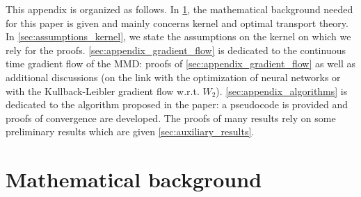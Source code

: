 

This appendix is organized as follows. In \cref{sec:appendix_math_background}, the mathematical background needed for this paper is given and mainly concerns kernel and optimal transport theory. In \cref{sec:assumptions_kernel}, we state the assumptions on the kernel on which we rely for the proofs. \cref{sec:appendix_gradient_flow} is dedicated to the continuous time gradient flow of the MMD: proofs of \cref{sec:appendix_gradient_flow} as well as additional discussions (on the link with the optimization of neural networks or with the Kullback-Leibler gradient flow w.r.t. $W_2$). \cref{sec:appendix_algorithms} is dedicated to the algorithm proposed in the paper: a pseudocode is provided and proofs of convergence are developed. The proofs of many results rely on some preliminary results which are given \cref{sec:auxiliary_results}.


\section{Mathematical background}\label{sec:appendix_math_background}

